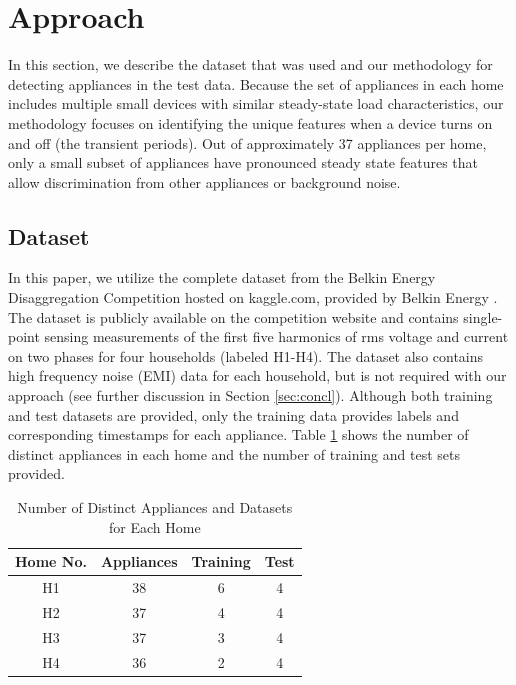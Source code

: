 \documentclass[conference]{IEEEtran}
\begin{document}
\section{Approach}\label{sec:dataMethod}

In this section, we describe the dataset that was used and our methodology for detecting appliances in the test data. Because the set of appliances in each home includes multiple small devices with similar steady-state load characteristics, our methodology focuses on identifying the unique features when a device turns on and off (the transient periods).  Out of approximately 37 appliances per home, only a small subset of appliances have pronounced steady state features that allow discrimination from other appliances or background noise.   

\subsection{Dataset}

In this paper, we utilize the complete dataset from the Belkin Energy Disaggregation Competition hosted on kaggle.com, provided by Belkin Energy \cite{Kaggle}.  The dataset is publicly available on the competition website and contains single-point sensing measurements of the first five harmonics of rms voltage and current on two phases for four households (labeled H1-H4). The dataset also contains high frequency noise (EMI) data for each household, but is not required with our approach (see further discussion in Section \ref{sec:concl}).  Although both training and test datasets are provided, only the training data provides labels and corresponding timestamps for each appliance. Table \ref{table:dataset} shows the number of distinct appliances in each home and the number of training and test sets provided. 

\begin{table}[h!]
	\renewcommand{\arraystretch}{1.3}
	\caption{Number of Distinct Appliances and Datasets for Each Home}\label{classes}
	\label{table:dataset}
	\centering
	\begin{tabular}{c||c||c||c}
		\hline 
		\textbf{Home No.} & \textbf{Appliances} &\textbf{Training} &\textbf{Test}\tabularnewline
		\hline 
		\hline 
		H1 & 38 & 6 & 4\tabularnewline
		\hline 
		H2 & 37 & 4 & 4\tabularnewline
		\hline 
		H3 & 37 & 3 & 4\tabularnewline
		\hline 
		H4 & 36 & 2 & 4\tabularnewline
		\hline 
	\end{tabular}
\end{table}
\end{document}
